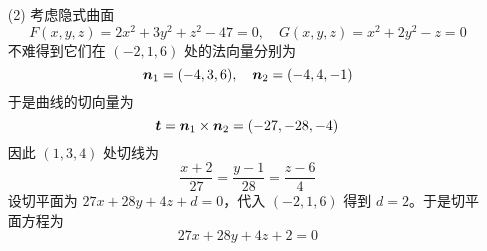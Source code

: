 \begin{solution}
    \begin{enumerate}
        \item [(2)]
考虑隐式曲面
\[
F(x, y, z) = 2x^2 + 3y^2 + z^2 - 47 = 0, \quad G(x, y, z) = x^2 + 2y^2 - z = 0
\]
不难得到它们在 $(-2, 1, 6)$ 处的法向量分别为
\[
\bm{n}_1 = (-4, 3, 6), \quad \bm{n}_2 = (-4, 4, -1)
\]
于是曲线的切向量为
\[
\bm{t} = \bm{n}_1 \times \bm{n}_2 = (-27, -28, -4)
\]
因此 $(1, 3, 4)$ 处切线为
\[
\frac{x + 2}{27} = \frac{y - 1}{28} = \frac{z - 6}{4}
\]
设切平面为 $27x + 28y + 4z + d = 0$，代入 $(-2, 1, 6)$ 得到 $d = 2$。于是切平面方程为
\[
27x + 28y + 4z + 2 = 0
\]
    \end{enumerate}
\end{solution}











